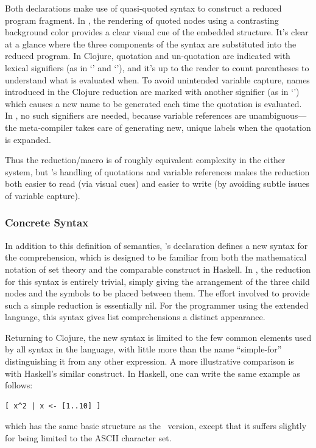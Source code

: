 Both declarations make use of quasi-quoted syntax to construct a reduced program fragment. In \Meta, the rendering of quoted nodes using a contrasting background color provides a clear visual cue of the embedded structure. It's clear at a glance where the three components of the syntax are substituted into the reduced program. In Clojure, quotation and un-quotation are indicated with lexical signifiers (as in `' and `'), and it's up to the reader to count parentheses to understand what is evaluated when. To avoid unintended variable capture, names introduced in the Clojure reduction are marked with another signifier (as in `') which causes a new name to be generated each time the quotation is evaluated. In \Meta, no such signifiers are needed, because variable references are unambiguous---the meta-compiler takes care of generating new, unique labels when the quotation is expanded.

Thus the reduction/macro is of roughly equivalent complexity in the either system, but \Meta's handling of quotations and variable references makes the reduction both easier to read (via visual cues) and easier to write (by avoiding subtle issues of variable capture).

\subsubsection{Concrete Syntax}
In addition to this definition of semantics, \Meta's declaration defines a new syntax for the comprehension, which is designed to be familiar from both the mathematical notation of set theory and the comparable construct in Haskell. In \Meta, the reduction for this syntax is entirely trivial, simply giving the arrangement of the three child nodes and the symbols to be placed between them. The effort involved to provide such a simple reduction is essentially nil. For the programmer using the extended language, this syntax gives list comprehensions a distinct appearance. 

Returning to Clojure, the new syntax is limited to the few common elements used by all syntax in the language, with little more than the name ``simple-for'' distinguishing it from any other expression. A more illustrative comparison is with Haskell's similar construct. In Haskell, one can write the same example as follows:
\begin{verbatim}
[ x^2 | x <- [1..10] ]
\end{verbatim}
which has the same basic structure as the \Meta\ version, except that it suffers slightly for being limited to the ASCII character set.

